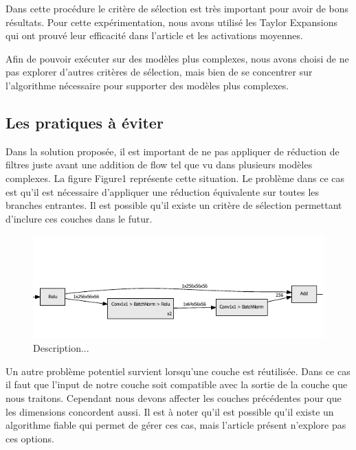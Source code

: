 \documentclass[12pt]{article}
\begin{document}
Dans cette procédure le critère de sélection est très important pour avoir de bons résultats. Pour cette expérimentation, nous avons utilisé les Taylor Expansions qui ont prouvé leur efficacité dans l'article et les activations moyennes. 

Afin de pouvoir exécuter sur des modèles plus complexes, nous avons choisi de ne pas explorer d'autres critères de sélection, mais bien de se concentrer sur l'algorithme nécessaire pour supporter des modèles plus complexes. 

\subsection{Les pratiques à éviter }
Dans la solution proposée, il est important de ne pas appliquer de réduction de filtres juste avant une addition de flow tel que vu dans plusieurs modèles complexes. La figure Figure1 représente cette situation. Le problème dans ce cas est qu’il est nécessaire d’appliquer une réduction équivalente sur toutes les branches entrantes.  Il est possible qu’il existe un critère de sélection permettant d’inclure ces couches dans le futur. 

\begin{figure}[H]
	\centering
	\includegraphics{residual_add}
	\caption{Description...}
	\label{fig:residualadd}
\end{figure}

Un autre problème potentiel survient lorsqu'une couche est réutilisée. Dans ce cas il faut que l'input de notre couche soit compatible avec la sortie de la couche que nous traitons. Cependant nous devons affecter les couches précédentes pour que les dimensions concordent aussi.
\newpage
Il est à noter qu'il est possible qu'il existe un algorithme fiable qui permet de gérer ces cas, mais l'article présent n'explore pas ces options.
\end{document}
